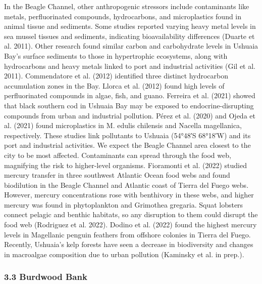 \documentclass[
]{article}
\begin{document}
In the Beagle Channel, other anthropogenic stressors include
contaminants like metals, perfluorinated compounds, hydrocarbons, and
microplastics found in animal tissue and sediments. Some studies
reported varying heavy metal levels in sea mussel tissues and sediments,
indicating bioavailability differences (Duarte et al. 2011). Other
research found similar carbon and carbohydrate levels in Ushuaia Bay's
surface sediments to those in hypertrophic ecosystems, along with
hydrocarbons and heavy metals linked to port and industrial activities
(Gil et al. 2011). Commendatore et al. (2012) identified three distinct
hydrocarbon accumulation zones in the Bay. Llorca et al. (2012) found
high levels of perfluorinated compounds in algae, fish, and guano.
Ferreira et al. (2021) showed that black southern cod in Ushuaia Bay may
be exposed to endocrine-disrupting compounds from urban and industrial
pollution. Pérez et al. (2020) and Ojeda et al. (2021) found
microplastics in M. edulis chilensis and Nacella magellanica,
respectively. These studies link pollutants to Ushuaia (54°48′S 68°18′W)
and its port and industrial activities. We expect the Beagle Channel
area closest to the city to be most affected. Contaminants can spread
through the food web, magnifying the risk to higher-level organisms.
Fioramonti et al. (2022) studied mercury transfer in three southwest
Atlantic Ocean food webs and found biodilution in the Beagle Channel and
Atlantic coast of Tierra del Fuego webs. However, mercury concentrations
rose with benthivory in these webs, and higher mercury was found in
phytoplankton and Grimothea gregaria. Squat lobsters connect pelagic and
benthic habitats, so any disruption to them could disrupt the food web
(Rodriguez et al. 2022). Dodino et al. (2022) found the highest mercury
levels in Magellanic penguin feathers from offshore colonies in Tierra
del Fuego. Recently, Ushuaia's kelp forests have seen a decrease in
biodiversity and changes in macroalgae composition due to urban
pollution (Kaminsky et al. in prep.).

\subsubsection{3.3 Burdwood Bank}\label{burdwood-bank}
\end{document}
